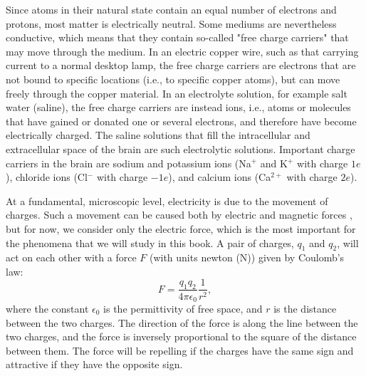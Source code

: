 Since atoms in their natural state contain an equal number of electrons and protons, most matter is electrically neutral. Some mediums are nevertheless conductive, which means that they contain so-called "free charge carriers" that may move through the medium. In an electric copper wire, such as that carrying current to a normal desktop lamp, the free charge carriers are electrons that are not bound to specific locations (i.e., to specific copper atoms), but can move freely through the copper material. In an electrolyte solution, for example salt water (saline), the free charge carriers are instead ions, i.e., atoms or molecules that have gained or donated one or several electrons, and therefore have become electrically charged. The saline solutions that fill the intracellular and extracellular space of the brain are such electrolytic solutions. Important charge carriers in the brain are sodium and potassium ions (Na$^+$ and K$^+$ with charge $1e$), chloride ions (Cl$^-$ with charge $-1e$), and calcium ions (Ca$^{2+}$ with charge $2e$).

At a fundamental, microscopic level, electricity is due to the movement of charges. Such a movement can be caused both by electric and magnetic forces , but for now, we consider only the electric force, which is the most important for the phenomena that we will study in this book. A pair of charges, $q_1$ and $q_2$, will act on each other with a force $F$ (with units newton (\si{\newton})) given by Coulomb's law:
\begin{equation}
F = \frac{q_1q_2}{4\pi \epsilon_0} \frac{1}{r^2},
\label{eq:Basics:CoulombF}
\end{equation}
where the constant $\epsilon_0$ is the permittivity of free space, and $r$ is the distance between the two charges. The direction of the force is along the line between the two charges, and the force is inversely proportional to the square of the distance between them. The force will be repelling if the charges have the same sign and attractive if they have the opposite sign. 


